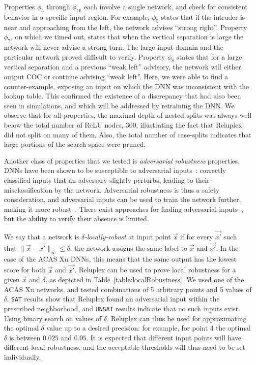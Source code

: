 \documentclass[a4paper]{llncs}
\newcommand{\sat}{\texttt{SAT}}
\newcommand{\unsat}{\texttt{UNSAT}}
\begin{document}
Properties $\phi_5$ through $\phi_{10}$ each involve a single network, and
check for consistent behavior in a specific input region. 
For example, $\phi_5$ states that if the intruder is near and approaching from the
left, the network advises ``strong right''.
Property $\phi_7$, on which we timed out,
 states that when the vertical separation is large
the network will never advise a strong turn. The large input
domain and the particular network proved difficult to verify. Property
$\phi_8$ states that for a large vertical separation and a previous
``weak left'' advisory, the network will either output COC or
continue advising ``weak left''. Here, we were
able to find a counter-example, exposing an input on which the DNN
was inconsistent with the lookup table. 
This confirmed the existence of a discrepancy that had also been seen in
simulations, and which
 will be addressed by retraining the DNN.
We observe that for all 
properties, the maximal depth of nested splits was always well below the total
number of ReLU nodes, 300, 
illustrating the fact that Reluplex did not split on many of
them. Also, the total number of case-splits indicates that
large portions of the search space were pruned.

Another class of properties that we tested is \emph{adversarial
  robustness} properties. DNNs have been shown
to be susceptible to adversarial inputs~\cite{SzZaSuBrErGoFe13}: 
correctly classified inputs that an adversary
slightly perturbs, leading to their misclassification by the
network. 
 Adversarial robustness is thus a safety
consideration, and adversarial inputs can be used to train the
network further, making it more robust~\cite{GoShSz14}.
There exist approaches for finding adversarial
inputs~\cite{GoShSz14,BaIoLaVyNoCr16}, but the ability to verify their
absence is limited.

We say that a network is $\delta$\emph{-locally-robust} at input
point $\vec{x}$ if for every $\vec{x'}$ such that $\| \vec{x} -
\vec{x'}\|_{\infty}\leq\delta$, the network assigns the same label to $\vec{x}$ 
and $\vec{x'}$.  
In the case of the ACAS Xu DNNs, this means that the same output has the lowest
score for both $\vec{x}$ and $\vec{x'}$.
Reluplex can be used 
to prove local robustness for a given $\vec{x}$ and $\delta$, as
depicted in Table~\ref{table:localRobustness}.
We used one of the ACAS Xu networks, and tested
combinations of 5 arbitrary points and 5 values of
$\delta$. \sat{} results show that 
Reluplex found an adversarial input within the prescribed
neighborhood, and \unsat{} results indicate
that no such inputs exist. 
Using binary search on values of $\delta$,
Reluplex can thus be used for approximating the optimal $\delta$
value up to a desired precision:
 for example, for point 4 the optimal $\delta$ is between $0.025$ and
 $0.05$.
It is expected that different input points will have different
local robustness, and the acceptable thresholds will thus need to be
set individually.
\end{document}
